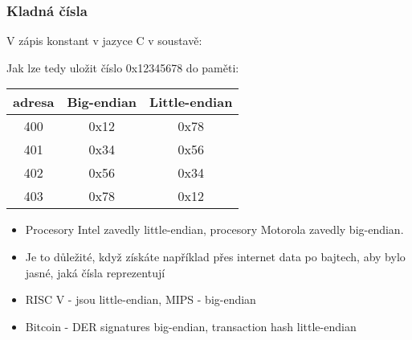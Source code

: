\documentclass{beamer}
\begin{document}
\begin{frame}
\frametitle{Kladná čísla}
V zápis konstant v jazyce C v soustavě:

Jak lze tedy uložit číslo 0x12345678 do paměti:
\begin{tabular}{|c|c|c|}\hline
adresa & Big-endian & Little-endian \\ \hline
400 & 0x12 & 0x78 \\ \hline
401 & 0x34 & 0x56 \\ \hline
402 & 0x56 & 0x34 \\ \hline
403 & 0x78 & 0x12 \\ \hline
\end{tabular}

\begin{itemize}
\item Procesory Intel zavedly little-endian, procesory Motorola zavedly big-endian.
\item Je to důležité, když získáte například přes internet data po bajtech, aby bylo jasné, jaká čísla reprezentují
\item RISC V - jsou little-endian, MIPS - big-endian
\item Bitcoin - DER signatures big-endian, transaction hash little-endian
\end{itemize}
\end{frame}
\end{document}
